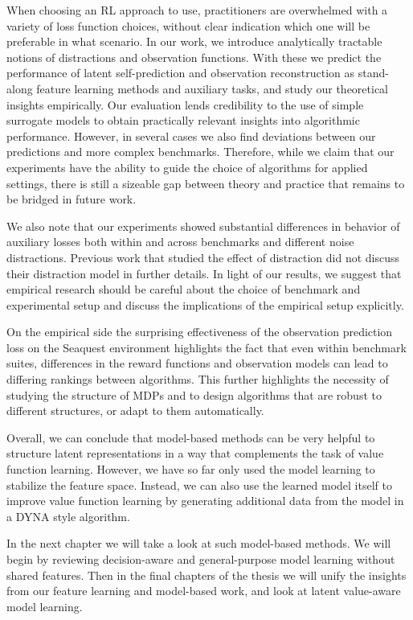 When choosing an RL approach to use, practitioners are overwhelmed with a variety of loss function choices, without clear indication which one will be preferable in what scenario.
In our work, we introduce analytically tractable notions of distractions and observation functions.
With these we predict the performance of latent self-prediction and observation reconstruction as stand-along feature learning methods and auxiliary tasks, and study our theoretical insights empirically.
Our evaluation lends credibility to the use of simple surrogate models to obtain practically relevant insights into algorithmic performance.
However, in several cases we also find deviations between our predictions and more complex benchmarks.
Therefore, while we claim that our experiments have the ability to guide the choice of algorithms for applied settings, there is still a sizeable gap between theory and practice that remains to be bridged in future work.

We also note that our experiments showed substantial differences in behavior of auxiliary losses both within and across benchmarks and different noise distractions.
Previous work that studied the effect of distraction \parencite{nikishin2021control,voelcker2022value,ni2024bridging} did not discuss their distraction model in further details. 
In light of our results, we suggest that empirical research should be careful about the choice of benchmark and experimental setup and discuss the implications of the empirical setup explicitly.

On the empirical side the surprising effectiveness of the observation prediction loss on the Seaquest environment highlights the fact that even within benchmark suites, differences in the reward functions and observation models can lead to differing rankings between algorithms.
This further highlights the necessity of studying the structure of MDPs and to design algorithms that are robust to different structures, or adapt to them automatically.

Overall, we can conclude that model-based methods can be very helpful to structure latent representations in a way that complements the task of value function learning.
However, we have so far only used the model learning to stabilize the feature space.
Instead, we can also use the learned model itself to improve value function learning by generating additional data from the model in a DYNA style algorithm.

In the next chapter we will take a look at such model-based methods.
We will begin by reviewing decision-aware and general-purpose model learning without shared features.
Then in the final chapters of the thesis we will unify the insights from our feature learning and model-based work, and look at latent value-aware model learning.
